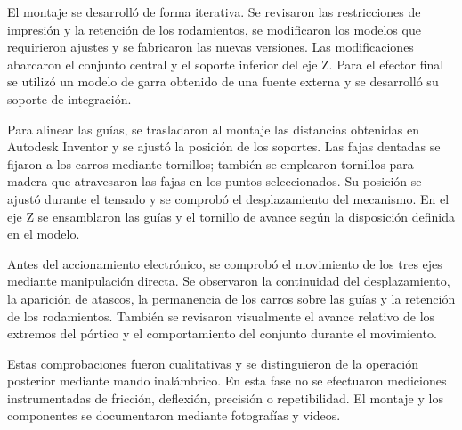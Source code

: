 El montaje se desarrolló de forma iterativa. Se revisaron las restricciones de impresión y la retención de los rodamientos, se modificaron los modelos que requirieron ajustes y se fabricaron las nuevas versiones. Las modificaciones abarcaron el conjunto central y el soporte inferior del eje Z. Para el efector final se utilizó un modelo de garra obtenido de una fuente externa y se desarrolló su soporte de integración.


Para alinear las guías, se trasladaron al montaje las distancias obtenidas en Autodesk Inventor y se ajustó la posición de los soportes. Las fajas dentadas se fijaron a los carros mediante tornillos; también se emplearon tornillos para madera que atravesaron las fajas en los puntos seleccionados. Su posición se ajustó durante el tensado y se comprobó el desplazamiento del mecanismo. En el eje Z se ensamblaron las guías y el tornillo de avance según la disposición definida en el modelo.

Antes del accionamiento electrónico, se comprobó el movimiento de los tres ejes mediante manipulación directa. Se observaron la continuidad del desplazamiento, la aparición de atascos, la permanencia de los carros sobre las guías y la retención de los rodamientos. También se revisaron visualmente el avance relativo de los extremos del pórtico y el comportamiento del conjunto durante el movimiento.

Estas comprobaciones fueron cualitativas y se distinguieron de la operación posterior mediante mando inalámbrico. En esta fase no se efectuaron mediciones instrumentadas de fricción, deflexión, precisión o repetibilidad. El montaje y los componentes se documentaron mediante fotografías y videos.




